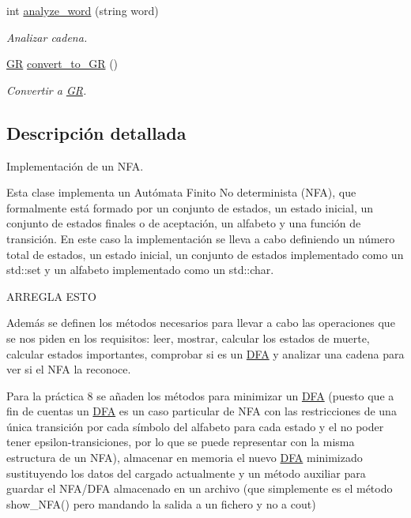 \begin{DoxyCompactItemize}
int \mbox{\hyperlink{class_d_f_a_a227c0b51b2f512efe3dad555438dcb87}{analyze\+\_\+word}} (string word)
\begin{DoxyCompactList}\small\item\em Analizar cadena. \end{DoxyCompactList}\item 
\mbox{\hyperlink{class_g_r}{GR}} \mbox{\hyperlink{class_d_f_a_a1e6d75070c094116a6d54f9ed61770e4}{convert\+\_\+to\+\_\+\+GR}} ()
\begin{DoxyCompactList}\small\item\em Convertir a \mbox{\hyperlink{class_g_r}{GR}}. \end{DoxyCompactList}\end{DoxyCompactItemize}


\subsection{Descripción detallada}
Implementación de un N\+FA. 

Esta clase implementa un Autómata Finito No determinista (N\+FA), que formalmente está formado por un conjunto de estados, un estado inicial, un conjunto de estados finales o de aceptación, un alfabeto y una función de transición. En este caso la implementación se lleva a cabo definiendo un número total de estados, un estado inicial, un conjunto de estados implementado como un std\+::set y un alfabeto implementado como un std\+::char.

\begin{DoxyVerb}                ARREGLA ESTO
\end{DoxyVerb}


Además se definen los métodos necesarios para llevar a cabo las operaciones que se nos piden en los requisitos\+: leer, mostrar, calcular los estados de muerte, calcular estados importantes, comprobar si es un \mbox{\hyperlink{class_d_f_a}{D\+FA}} y analizar una cadena para ver si el N\+FA la reconoce.

Para la práctica 8 se añaden los métodos para minimizar un \mbox{\hyperlink{class_d_f_a}{D\+FA}} (puesto que a fin de cuentas un \mbox{\hyperlink{class_d_f_a}{D\+FA}} es un caso particular de N\+FA con las restricciones de una única transición por cada símbolo del alfabeto para cada estado y el no poder tener epsilon-\/transiciones, por lo que se puede representar con la misma estructura de un N\+FA), almacenar en memoria el nuevo \mbox{\hyperlink{class_d_f_a}{D\+FA}} minimizado sustituyendo los datos del cargado actualmente y un método auxiliar para guardar el N\+F\+A/\+D\+FA almacenado en un archivo (que simplemente es el método show\+\_\+\+N\+F\+A() pero mandando la salida a un fichero y no a cout) 

